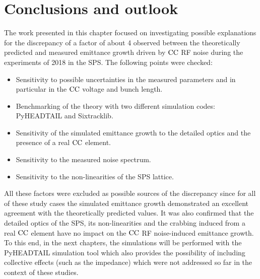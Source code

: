 \section{Conclusions and outlook}\label{sec:Ch6_conclusions}
The work presented in this chapter focused on investigating possible explanations for the discrepancy of a factor of about 4 observed between the theoretically predicted and measured emittance growth driven by ${\mathrm{CC}}$ RF noise during the experiments of 2018 in the SPS. The following points were checked:
\begin{itemize}
    \item Sensitivity to possible uncertainties in the measured parameters and in particular in the ${\mathrm{CC}}$ voltage and bunch length.
    \item Benchmarking of the theory with two different simulation codes: PyHEADTAIL and Sixtracklib.
    \item Sensitivity of the simulated emittance growth to the detailed optics and the presence of a real ${\mathrm{CC}}$ element.
    \item Sensitivity to the measured noise spectrum. 
    \item Sensitivity to the non-linearities of the SPS lattice.
\end{itemize}

All these factors were excluded as possible sources of the discrepancy since for all of these study cases the simulated emittance growth demonstrated an excellent agreement with the theoretically predicted values. It was also confirmed that the detailed optics of the SPS, its non-linearities and the crabbing induced from a real ${\mathrm{CC}}$ element have no impact on the ${\mathrm{CC}}$ RF noise-induced emittance growth. To this end, in the next chapters, the simulations will be performed with the PyHEADTAIL simulation tool which also provides the possibility of including collective effects (such as the impedance) which were not addressed so far in the context of these studies.